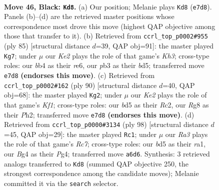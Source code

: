 \documentclass[11pt]{article}
\begin{document}
\clearpage

\begin{figure}[p]\centering
\begin{subfigure}{0.46\textwidth}\centering
\resizebox{\linewidth}{!}{%
\newchessgame
\chessboard[
  setfen={6r1/4k3/r7/3B2p1/1B3pb1/PP6/1K5P/R5N1 b - - 1 46},
  showmover=false,
  pgfstyle=straightmove, color=movearrow, markmove={e7-d8}
]}
\caption{}
\end{subfigure}\hfill
\begin{subfigure}{0.46\textwidth}\centering
\resizebox{\linewidth}{!}{%
\newchessgame
\chessboard[
  setfen={1r6/8/r2PR2k/2pB1p1p/2N5/1b5P/5PP1/6K1 b - - 11 43},
  showmover=false,
  pgfstyle=straightmove, color=movearrow, markmove={h6-g7}
]}
\caption{}
\end{subfigure}
\\[4pt]
\begin{subfigure}{0.46\textwidth}\centering
\resizebox{\linewidth}{!}{%
\newchessgame
\chessboard[
  setfen={8/3R1pkp/6p1/1p2br2/8/1P6/2R4P/5K2 w - - 7 46},
  showmover=false,
  pgfstyle=straightmove, color=movearrow, markmove={f1-g2}
]}
\caption{}
\end{subfigure}\hfill
\begin{subfigure}{0.46\textwidth}\centering
\resizebox{\linewidth}{!}{%
\newchessgame
\chessboard[
  setfen={8/2R2pk1/4b2p/8/4PRP1/p6P/3K4/r7 w - - 0 50},
  showmover=false,
  pgfstyle=straightmove, color=movearrow, markmove={c7-c1}
]}
\caption{}
\end{subfigure}
\caption{\textbf{Move 46, Black: \texttt{Kd8}.} (a) Our position; Melanie plays \texttt{Kd8} (\texttt{e7d8}). Panels (b)--(d) are the retrieved master positions whose correspondence most drove this move (highest QAP objective among those that transfer to it). (b) Retrieved from \texttt{ccrl\_top\_p0002\#955} (ply 85) [structural distance $d$=39, QAP obj=91]: the master played \texttt{Kg7}; under $\mu$ our \emph{Ke2} plays the role of that game's \emph{Kh3}; cross-type roles: our \emph{b}b4 as their \emph{r}e6, our \emph{p}b3 as their \emph{b}d5; transferred move \texttt{e7d8} \textbf{(endorses this move)}. (c) Retrieved from \texttt{ccrl\_top\_p0002\#162} (ply 90) [structural distance $d$=40, QAP obj=68]: the master played \texttt{Kg2}; under $\mu$ our \emph{Ke2} plays the role of that game's \emph{Kf1}; cross-type roles: our \emph{b}d5 as their \emph{R}c2, our \emph{R}g8 as their \emph{P}h2; transferred move \texttt{e7d8} \textbf{(endorses this move)}. (d) Retrieved from \texttt{ccrl\_top\_p0000\#3134} (ply 98) [structural distance $d$=45, QAP obj=29]: the master played \texttt{Rc1}; under $\mu$ our \emph{Ra3} plays the role of that game's \emph{Rc7}; cross-type roles: our \emph{b}d5 as their \emph{r}a1, our \emph{B}g4 as their \emph{P}g4; transferred move \texttt{a6d6}. Synthesis: 3 retrieved analogs transferred to \texttt{Kd8} (summed QAP objective 250, the strongest correspondence among the candidate moves); Melanie committed it via the \texttt{search} selector.}
\label{fig:thought-m91}
\end{figure}
\end{document}
